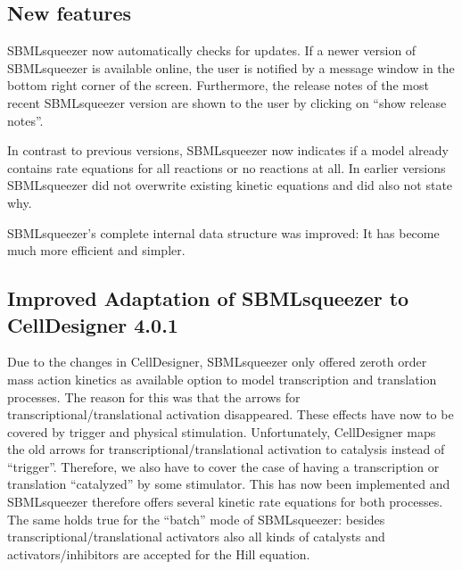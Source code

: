 \subsection{New features}

SBMLsqueezer now automatically checks for updates. If a newer version of
SBMLsqueezer is available online, the user is notified by a message window in
the bottom right corner of the screen. Furthermore, the release notes of the
most recent SBMLsqueezer version are shown to the user by clicking on ``show
release notes''.

In contrast to previous versions, SBMLsqueezer now indicates if a model already
contains rate equations for all reactions or no reactions at all. In earlier
versions SBMLsqueezer did not overwrite existing kinetic equations and did also
not state why.

SBMLsqueezer's complete internal data structure was improved: It has become much
more efficient and simpler.

\subsection{Improved Adaptation of SBMLsqueezer to CellDesigner 4.0.1}

Due to the changes in CellDesigner, SBMLsqueezer only offered zeroth order mass
action kinetics as available option to model transcription and translation
processes. The reason for this was that the arrows for
transcriptional/translational activation disappeared. These effects have now to
be covered by trigger and physical stimulation. Unfortunately, CellDesigner maps
the old arrows for transcriptional/translational activation to catalysis instead
of ``trigger''. Therefore, we also have to cover the case of having a
transcription or translation ``catalyzed'' by some stimulator. This has now been
implemented and SBMLsqueezer therefore offers several kinetic rate equations for
both processes. The same holds true for the ``batch'' mode of SBMLsqueezer:
besides transcriptional/translational activators also all kinds of catalysts and
activators/inhibitors are accepted for the Hill equation.

